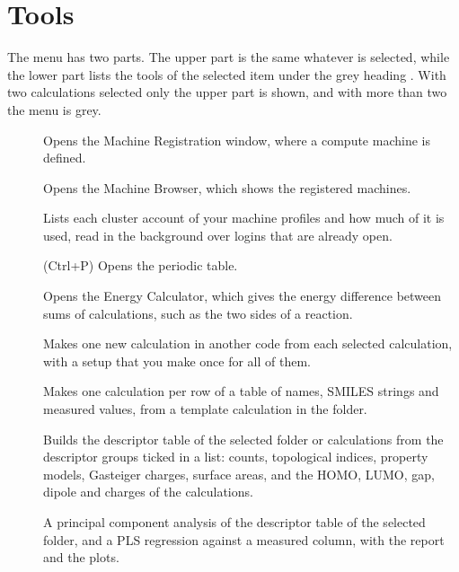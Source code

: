 \section{Tools}
The  menu has two parts. The upper part is the same whatever is selected, while the lower part lists the tools of the selected item under the grey heading . With two calculations selected only the upper part is shown, and with more than two the menu is grey.
\begin{description}
	\item[] Opens the Machine Registration window, where a compute machine is defined.
	\item[] Opens the Machine Browser, which shows the registered machines.
	\item[] Lists each cluster account of your machine profiles and how much of it is used, read in the background over logins that are already open.
	\item[] (\textsf{Ctrl+P}) Opens the periodic table.
	\item[] Opens the Energy Calculator, which gives the energy difference between sums of calculations, such as the two sides of a reaction.
	\item[] Makes one new calculation in another code from each selected calculation, with a setup that you make once for all of them.
	\item[] Makes one calculation per row of a table of names, SMILES strings and measured values, from a template calculation in the folder.
	\item[] Builds the descriptor table of the selected folder or calculations from the descriptor groups ticked in a list: counts, topological indices, property models, Gasteiger charges, surface areas, and the HOMO, LUMO, gap, dipole and charges of the calculations.
	\item[] A principal component analysis of the descriptor table of the selected folder, and a PLS regression against a measured column, with the report and the plots.

\end{description}
